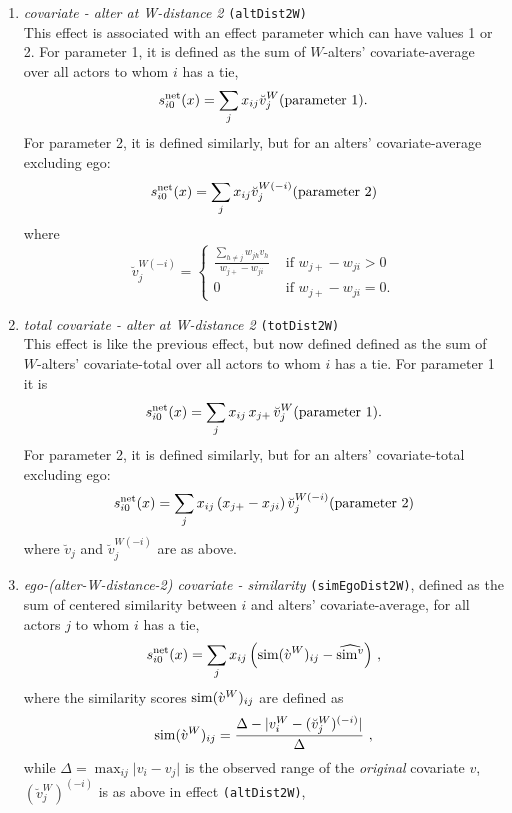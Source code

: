 \documentclass[a4paper,fleqn,11pt]{article}
\newcommand{\+}{\, + \,}
\newcommand{\vit}{\theenumi}
\newcounter{savenumi}
\begin{document}
\begin{enumerate}
\setcounter{enumi}{\value{savenumi}}

\item \emph{covariate - alter at W-distance 2} \texttt{(altDist2W)} \\ %
      This effect is associated with an effect parameter
      which can have values 1 or 2.
      For parameter 1, it is
      defined as the sum of $W$-alters' covariate-average over all actors
      to whom $i$ has a tie,
\[
 s^{\rm net}_{i\vit}(x) = \sum_j x_{ij} \breve v_j^W \hfill (\text{parameter 1}). \hfill
\]
      For parameter 2, it is defined similarly,
      but for an alters' covariate-average excluding
      ego:
\[
 s^{\rm net}_{i\vit}(x) = \sum_j x_{ij} \breve v_j^{W(-i)} \hfill (\text{parameter 2}) \hfill
\]
      where
\begin{equation}
  \breve v_j^{W(-i)} = \left\{\begin{array}{ll} \displaystyle
         \frac{\sum_{h \neq j} w_{jh}v_h}{w_{j+} - w_{ji}}  &  \text{ if } w_{j+} - w_{ji} > 0     \\
         0                                &  \text{ if } w_{j+}- w_{ji} = 0  .
  \end{array}   \right.
\end{equation}

\item \emph{total covariate - alter at W-distance 2} \texttt{(totDist2W)} \\
      This effect is like the previous effect, but now defined
      defined as the sum of $W$-alters' covariate-total over all actors
      to whom $i$ has a tie. For parameter 1 it is
\[
 s^{\rm net}_{i\vit}(x) = \sum_j x_{ij}\, x_{j+} \, \breve v_j^W \hfill (\text{parameter 1}). \hfill
\]
      For parameter 2, it is defined similarly,
      but for an alters' covariate-total excluding
      ego:
\[
 s^{\rm net}_{i\vit}(x) = \sum_j x_{ij} \, (x_{j+}  - x_{ji}) \,
               \breve v_j^{W(-i)} \hfill (\text{parameter 2}) \hfill
\]
      where $ \breve v_j$ and $ \breve v_j^{W(-i)}$ are as above.

\item \emph{ego-(alter-W-distance-2) covariate - similarity} \texttt{(simEgoDist2W)},
      defined as the sum of centered similarity  between $i$
      and alters' covariate-average, for all actors
      $j$ to whom $i$ has a tie,
\[
 s^{\rm net}_{i\vit}(x) = \sum_j x_{ij}\, \Big({\rm sim}(\grave v^W)_{ij}
  - \widehat{{\rm sim}^v}\Big) \ ,
\]
 where the similarity scores ${\rm sim}(\grave v^W)_{ij}$ are defined as
\[
{\rm sim}(\grave v^W)_{ij}=
 \frac{\Delta-\vert  v^W_i - ( \breve v^W_j)^{(-i)} \vert}{\Delta} \ ,
\]
 while
 $\Delta=\max_{ij}\vert v_i - v_j \vert$ is the observed range of the
 \emph{original} covariate $v$,
 $ (\breve v^W_j)^{(-i)}$ is as above in effect \texttt{(altDist2W)},


\end{enumerate}
\end{document}
